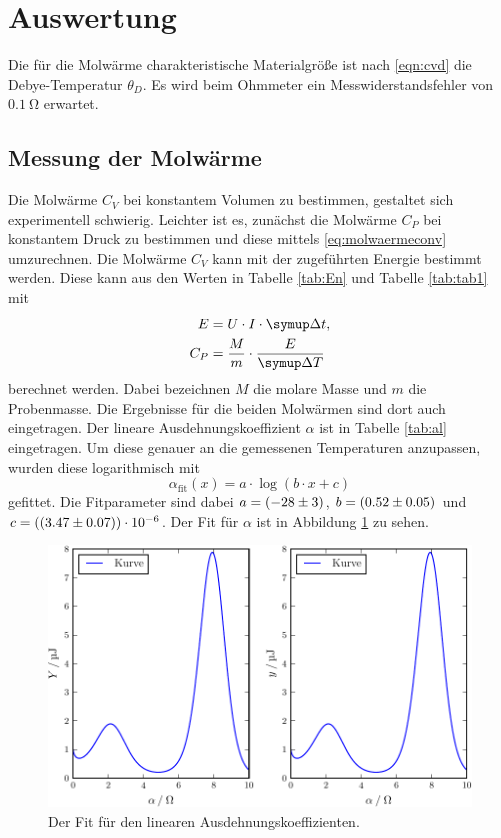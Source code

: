 \section{Auswertung}
\label{sec:Auswertung}
Die für die Molwärme charakteristische Materialgröße ist nach \eqref{eqn:cvd} die Debye-Temperatur $\theta_D$. 
Es wird beim Ohmmeter ein Messwiderstandsfehler von $\SI{0.1}{\ohm}$ erwartet.
\subsection{Messung der Molwärme}
Die Molwärme $C_V$ bei konstantem Volumen zu bestimmen, gestaltet sich experimentell schwierig. Leichter ist es, zunächst die Molwärme $C_P$ bei konstantem Druck zu bestimmen und diese mittels \eqref{eq:molwaermeconv}
umzurechnen. 
Die Molwärme $C_V$ kann mit der zugeführten Energie bestimmt werden. Diese kann aus den Werten in Tabelle \ref{tab:En} und Tabelle \ref{tab:tab1} mit
\begin{align}
	E &= U \cdot I \cdot \symup\Delta t,\\
	C_P &= \frac{M}{m}\cdot\frac{E}{\symup\Delta T}
	\label{eqn:cp}
\end{align}
berechnet werden. Dabei bezeichnen $M$ die molare Masse und $m$ die Probenmasse. Die Ergebnisse für die beiden Molwärmen sind dort auch eingetragen. 
Der lineare Ausdehnungskoeffizient $\alpha$ ist in Tabelle \ref{tab:al} eingetragen. Um diese genauer an die gemessenen Temperaturen anzupassen, wurden diese logarithmisch mit
\begin{equation*}
	\alpha_\text{fit}(x) = a\cdot\log{(b\cdot x + c)}
\end{equation*}
gefittet. Die Fitparameter sind dabei $a = \SI{-28 \pm 3}{}$, $b = \SI{
0.52\pm0.05}{}$ und $c = (\SI{3.47\pm0.07}{})\cdot 10^{-6}$.
Der Fit für $\alpha$ ist in Abbildung \ref{fig:a} zu sehen.
\begin{figure}
  \centering
  \includegraphics[width=\textwidth]{pc/plot.pdf}
  \caption{Der Fit für den linearen Ausdehnungskoeffizienten.}
  \label{fig:a}
\end{figure}



